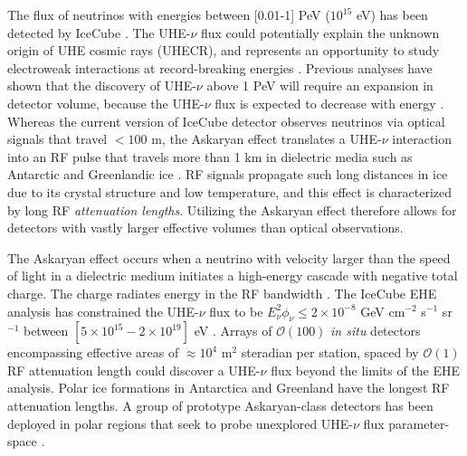 \documentclass[../../main.tex]{subfiles}
\begin{document}
The flux of neutrinos with energies between [0.01-1] PeV ($10^{15}$ eV) has been detected by IceCube \cite{10.1126/science.1242856}.  The UHE-$\nu$ flux could potentially explain the unknown origin of UHE cosmic rays (UHECR), and represents an opportunity to study electroweak interactions at record-breaking energies \cite{Ackermann:201946d,Ackermann:20195ec}.  Previous analyses have shown that the discovery of UHE-$\nu$ above 1 PeV will require an expansion in detector volume, because the UHE-$\nu$ flux is expected to decrease with energy \cite{10.1016/j.astropartphys.2010.06.003,10.1088/1475-7516/2010/10/013,10.1103/physrevd.98.062003,10.1088/1475-7516/2020/03/053,10.1103/physrevd.102.043021}.  Whereas the current version of IceCube detector observes neutrinos via optical signals that travel $<100$ m, the Askaryan effect translates a UHE-$\nu$ interaction into an RF pulse that travels more than 1 km in dielectric media such as Antarctic and Greenlandic ice \cite{10.3189/2015jog14j214, 10.3189/2015jog15j057, 10.1016/j.astropartphys.2011.11.010}.  RF signals propagate such long distances in ice due to its crystal structure and low temperature, and this effect is characterized by long RF \textit{attenuation lengths}.  Utilizing the Askaryan effect therefore allows for detectors with vastly larger effective volumes than optical observations. \\ \vspace{2.5mm}

The Askaryan effect occurs when a neutrino with velocity larger than the speed of light in a dielectric medium initiates a high-energy cascade with negative total charge.  The charge radiates energy in the RF bandwidth \cite{askaryan1,zhs}.  The IceCube EHE analysis has constrained the UHE-$\nu$ flux to be $E_\nu^2 \phi_\nu \leq 2 \times 10^{-8}$ GeV cm$^{-2}$ s$^{-1}$ sr$^{-1}$ between $[5\times 10^{15} - 2\times 10^{19}]$ eV \cite{10.1103/physrevd.98.062003}.  Arrays of $\mathcal{O}(100)$ \textit{in situ} detectors encompassing effective areas of $\approx 10^4$ m$^2$ steradian per station, spaced by $\mathcal{O}(1)$ RF attenuation length could discover a UHE-$\nu$ flux beyond the limits of the EHE analysis.  Polar ice formations in Antarctica and Greenland have the longest RF attenuation lengths.  A group of prototype Askaryan-class detectors has been deployed in polar regions that seek to probe unexplored UHE-$\nu$ flux parameter-space \cite{rice,10.1088/1475-7516/2020/03/053,10.1103/physrevd.102.043021,10.1103/physrevd.99.122001}. \\ \vspace{2.5mm}
\end{document}

